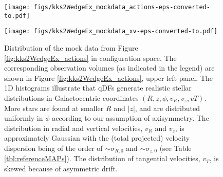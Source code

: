 \documentclass[iop,revtex4,numberedappendix,appendixfloats]{emulateapj}
\begin{document}
\begin{figure}[!htbp]
\centering
\begin{minipage}{0.48\textwidth}
\centering
\texttt{[image: figs/kks2WedgeEx\_mockdata\_actions-eps-converted-to.pdf]}
\caption{Distribution of mock data in action space (2D iso-density contours, enclosing 80\% of the stars) depending on shape and position of a wedge-like survey observation volume (upper left panel, see also Appendix \ref{app:selectionfunction}), and temperature of the stellar population (indicated in the legend). The four mock data sets are generated in the \texttt{KKS-Pot} from Table \ref{tbl:referencepotentials} from either the \texttt{hot} or \texttt{cool} DF in Table \ref{tbl:referenceMAPs}. The distribution in action space visualizes how orbits with different actions reach into different regions within the Galaxy. The corresponding mock data in configuration space is shown in Figure \ref{fig:kks2WedgeEx_xv}.} 
\label{fig:kks2WedgeEx_actions}
\end{minipage}
\hfill
\begin{minipage}{0.48\textwidth}
\centering
\texttt{[image: figs/kks2WedgeEx\_mockdata\_xv-eps-converted-to.pdf]}
\caption{Distribution of the mock data from Figure \ref{fig:kks2WedgeEx_actions} in configuration space. The corresponding observation volumes (as indicated in the legend) are shown in Figure \ref{fig:kks2WedgeEx_actions}, upper left panel. The 1D histograms illustrate that qDFs generate realistic stellar distributions in Galactocentric coordinates $(R,z,\phi,v_R,v_z,vT)$. More stars are found at smaller $R$ and $|z|$, and are distributed uniformly in $\phi$ according to our assumption of axisymmetry. The distribution in radial and vertical velocities, $v_R$ and $v_z$, is approximately Gaussian with the (total projected) velocity dispersion being of the order of $\sim\sigma_{R,0}$ and $\sim\sigma_{z,0}$ (see Table \ref{tbl:referenceMAPs}). The distribution of tangential velocities, $v_T$, is skewed because of asymmetric drift.} 
\label{fig:kks2WedgeEx_xv}
\end{minipage}
\end{figure}
\end{document}

